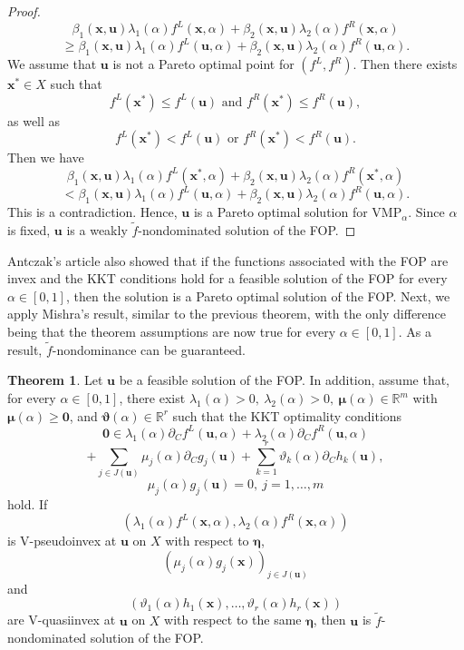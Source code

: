 \documentclass{article}
\theoremstyle{definition}
\newtheorem{theorem}[maar]{Theorem}
\begin{document}
\begin{proof}
$$\beta_1(\boldsymbol x, \boldsymbol u)  \lambda_1( \alpha) f^L(\boldsymbol x,  \alpha) + \beta_2(\boldsymbol x, \boldsymbol u)  \lambda_2( \alpha) f^R(\boldsymbol x,  \alpha)$$
$$\geq \beta_1(\boldsymbol x, \boldsymbol u)  \lambda_1( \alpha) f^L(\boldsymbol u,  \alpha) + \beta_2(\boldsymbol x, \boldsymbol u)  \lambda_2( \alpha) f^R(\boldsymbol u,  \alpha).$$
We assume that $\boldsymbol u$ is not a Pareto optimal point for $(f^L,f^R)$. Then there exists $\boldsymbol x^*\in X$ such that $$f^L(\boldsymbol x^*) \leq f^L(\boldsymbol u)\text{ and } f^R(\boldsymbol x^*) \leq f^R(\boldsymbol u),$$ as well as $$f^L(\boldsymbol x^*) < f^L(\boldsymbol u)\text{ or } f^R(\boldsymbol x^*) < f^R(\boldsymbol u).$$ Then we have
$$\beta_1(\boldsymbol x, \boldsymbol u)  \lambda_1( \alpha) f^L(\boldsymbol x^*,  \alpha) + \beta_2(\boldsymbol x, \boldsymbol u)  \lambda_2( \alpha) f^R(\boldsymbol x^*,  \alpha)$$
$$< \beta_1(\boldsymbol x, \boldsymbol u)  \lambda_1( \alpha) f^L(\boldsymbol u,  \alpha) + \beta_2(\boldsymbol x, \boldsymbol u)  \lambda_2( \alpha) f^R(\boldsymbol u,  \alpha).$$
This is a contradiction. Hence, $\boldsymbol u$ is a Pareto optimal solution for VMP$_{\alpha}$. Since $\alpha$ is fixed, $\boldsymbol u$ is a weakly $\tilde f$-nondominated solution of the FOP. 
\end{proof}

Antczak's article \cite{Ant} also showed that if the functions associated with the FOP are invex and the KKT conditions hold for a feasible solution of the FOP for every $\alpha \in [0,1]$, then the solution is a Pareto optimal solution of the FOP. Next, we apply Mishra's result, similar to the previous theorem, with the only difference being that the theorem assumptions are now true for every $\alpha \in [0,1]$. As a result, $\tilde f$-nondominance can be guaranteed.

\begin{theorem}\label{4.3.3} Let $\boldsymbol u$ be a feasible solution of the FOP. In addition, assume that, for every $\alpha \in [0,1]$, there exist $ \lambda_1(\alpha) > 0,\  \lambda_2(\alpha) > 0,\  {\boldsymbol \mu}(\alpha) \in \mathbb R^{m}$ with ${\boldsymbol \mu}(\alpha) \geq {\boldsymbol 0}$, and $ {\boldsymbol \vartheta}( \alpha) \in \mathbb R^r$ such that the KKT optimality conditions
$$\boldsymbol 0 \in  \lambda_1(\alpha)\partial_C f^L(\boldsymbol u, \alpha) +  \lambda_2(\alpha)\partial_C f^R(\boldsymbol u, \alpha)$$
$$+\sum_{j \in J(\boldsymbol{u})}  \mu_j(\alpha)\partial_C g_j(\boldsymbol u) + \sum_{k=1}^r  \vartheta_k( \alpha)\partial_C h_k(\boldsymbol u),$$
$$ \mu_j(\alpha)g_j(\boldsymbol u) = 0,\ j=1,\dots,m$$
hold. If $$( \lambda_1(\alpha) f^L(\boldsymbol x, \alpha),  \lambda_2(\alpha) f^R(\boldsymbol x, \alpha))$$ is V-pseudoinvex at $\boldsymbol u$ on $X$ with respect to $\boldsymbol \eta$, $$( \mu_j( \alpha) g_j(\boldsymbol x))_{j \in J(\boldsymbol{u})}$$ and $$( \vartheta_1(\alpha) h_1(\boldsymbol x),\dots,  \vartheta_r(\alpha) h_r(\boldsymbol x))$$ are V-quasiinvex at $\boldsymbol u$ on $X$  with respect to the same $\boldsymbol \eta$, then $\boldsymbol u$ is $\tilde f$-nondominated solution of the FOP.
\end{theorem}
\end{document}
